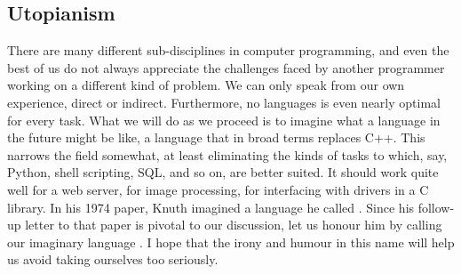 \documentclass[10pt]{amsart}
\begin{document}



\subsection{Utopianism}

There are many different sub-disciplines in computer programming, and
even the best of us do not always appreciate the challenges faced by
another programmer working on a different kind of problem.  We can
only speak from our own experience, direct or indirect.  Furthermore,
no languages is even nearly optimal for every task.  What we will do
as we proceed is to imagine what a language in the future might be
like, a language that in broad terms replaces C++.  This narrows the
field somewhat, at least eliminating the kinds of tasks to which, say,
Python, shell scripting, SQL, and so on, are better suited.  It should
work quite well for a web server, for image processing, for
interfacing with drivers in a C library.  In his 1974 paper, Knuth
imagined a language he called \UtopiaOld\@.  Since his follow-up
letter to that paper is pivotal to our discussion, let us honour him
by calling our imaginary language \Utop\@.  I hope that the irony and
humour in this name will help us avoid taking ourselves too seriously.
\end{document}
